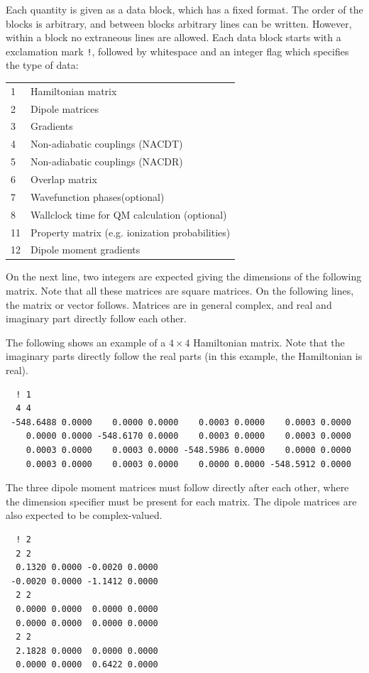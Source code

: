 \documentclass[a4paper,11pt,DIV=15,openany,twoside=false]{scrbook}
\newcommand{\ttt}[1]{\texttt{#1}}
\newenvironment{example}{
  \vspace{0mm}
  \definecolor{shadecolor}{HTML}{BBDDFF}
  \begin{shaded}
  \begin{minipage}{0.9\textwidth}
}{
  \end{minipage}
  \end{shaded}
}
\begin{document}
Each quantity is given as a data block, which has a fixed format. The order of the blocks is arbitrary, and between blocks arbitrary lines can be written. However, within a block no extraneous lines are allowed. Each data block starts with a exclamation mark \ttt{!}, followed by whitespace and an integer flag which specifies the type of data:

\begin{tabular}{ll}
1       &Hamiltonian matrix\\
2       &Dipole matrices\\
3       &Gradients\\
4       &Non-adiabatic couplings (NACDT)\\
5       &Non-adiabatic couplings (NACDR)\\
6       &Overlap matrix\\
7       &Wavefunction phases(optional)\\
8       &Wallclock time for QM calculation (optional)\\
11      &Property matrix (e.g. ionization probabilities)\\
12      &Dipole moment gradients\\
\end{tabular}

On the next line, two integers are expected giving the dimensions of the following matrix. Note that all these matrices are square matrices. On the following lines, the matrix or vector follows. Matrices are in general complex, and real and imaginary part directly follow each other. 

The following shows an example of a $4\times 4$ Hamiltonian matrix. Note that the imaginary parts directly follow the real parts (in this example, the Hamiltonian is real).
\begin{example}
  \begin{verbatim}
  ! 1
  4 4
 -548.6488 0.0000    0.0000 0.0000    0.0003 0.0000    0.0003 0.0000
    0.0000 0.0000 -548.6170 0.0000    0.0003 0.0000    0.0003 0.0000
    0.0003 0.0000    0.0003 0.0000 -548.5986 0.0000    0.0000 0.0000
    0.0003 0.0000    0.0003 0.0000    0.0000 0.0000 -548.5912 0.0000
  \end{verbatim}
\end{example}

The three dipole moment matrices must follow directly after each other, where the dimension specifier must be present for each matrix. The dipole matrices are also expected to be complex-valued.
\begin{example}
  \begin{verbatim}
  ! 2
  2 2
  0.1320 0.0000 -0.0020 0.0000
 -0.0020 0.0000 -1.1412 0.0000
  2 2
  0.0000 0.0000  0.0000 0.0000
  0.0000 0.0000  0.0000 0.0000
  2 2
  2.1828 0.0000  0.0000 0.0000
  0.0000 0.0000  0.6422 0.0000
  \end{verbatim}
\end{example}
\end{document}
